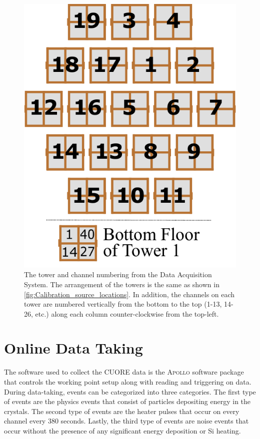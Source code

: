 \begin{figure}
    \centering
    \includegraphics[width=0.5\linewidth]{Figures/Crystals_numbering_only.pdf}
    \caption[The tower and channel numbering from the Data Acquisition System]
    {The tower and channel numbering from the Data Acquisition System.
    The arrangement of the towers is the same as shown in \autoref{fig:Calibration_source_locations}.
    In addition, the channels on each tower are numbered vertically from the bottom to the top (1-13, 14-26, etc.) along each column counter-clockwise from the top-left.}
    \label{fig:DAQ_tower_numbering}
\end{figure}

\section{Online Data Taking}
\label{sec:Online Data Taking}
The software used to collect the CUORE data is the \textsc{Apollo} software package that controls the working point setup along with reading and triggering on data.
During data-taking, events can be categorized into three categories.
The first type of events are the physics events that consist of particles depositing energy in the crystals.
The second type of events are the heater pulses that occur on every channel every 380 seconds.
Lastly, the third type of events are noise events that occur without the presence of any significant energy deposition or Si heating. 
